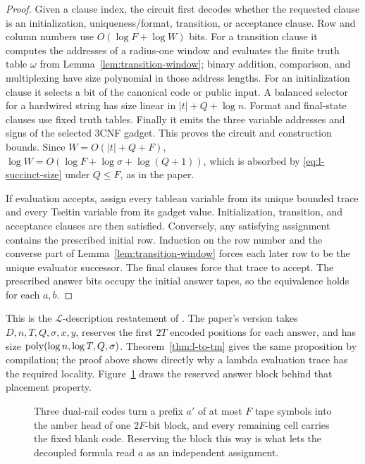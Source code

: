 \begin{proof}
Given a clause index, the circuit first decodes whether the requested clause is
an initialization, uniqueness/format, transition, or acceptance clause.  Row
and column numbers use \(O(\log F+\log W)\) bits.  For a transition clause it
computes the addresses of a radius-one window and evaluates the finite truth
table \(\omega\) from Lemma~\ref{lem:transition-window}; binary addition,
comparison, and multiplexing have size polynomial in those address lengths.
For an initialization clause it selects a bit of the canonical code or public
input.  A balanced selector for a hardwired string has size linear in
\(|t|+Q+\log n\).  Format and final-state clauses use fixed truth tables.
Finally it emits the three variable addresses and signs of the selected
3CNF gadget.  This proves the circuit and construction bounds.  Since
\(W=O(|t|+Q+F)\), \(\log W=O(\log F+\log\sigma+\log(Q+1))\), which is absorbed
by \eqref{eq:l-succinct-size} under \(Q\leq F\), as in the paper.

If evaluation accepts, assign every tableau variable from its unique bounded
trace and every Tseitin variable from its gadget value.  Initialization,
transition, and acceptance clauses are then satisfied.  Conversely, any
satisfying assignment contains the prescribed initial row.  Induction on the
row number and the converse part of Lemma~\ref{lem:transition-window} forces
each later row to be the unique evaluator successor.  The final clauses force
that trace to accept.  The prescribed answer bits occupy the initial answer
tapes, so the equivalence holds for each \(a,b\).
\end{proof}

This is the \(\mathcal L\)-description restatement of
.  The paper's version takes \(D,n,T,Q,
\sigma,x,y\), reserves the first \(2T\) encoded positions for each answer, and
has size \(\operatorname{poly}(\log n,\log T,Q,\sigma)\).
Theorem~\ref{thm:l-to-tm} gives the same proposition by compilation; the proof
above shows directly why a lambda evaluation trace has the required locality.
Figure~\ref{fig:D-answer-block} draws the reserved answer block behind that
placement property.
\begin{figure}[H]
\centering

\caption{Three dual-rail codes turn a prefix \(a'\) of at most \(F\) tape symbols into the amber head of one \(2F\)-bit block, and every remaining cell carries the fixed blank code.  Reserving the block this way is what lets the decoupled formula read \(a\) as an independent assignment.}
\label{fig:D-answer-block}
\end{figure}

